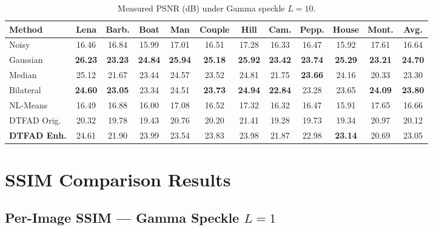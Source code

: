 \documentclass[12pt,a4paper]{article}
\newcommand{\best}[1]{\textcolor{bestgreen}{\textbf{#1}}}
\newcommand{\second}[1]{\textcolor{secondbest}{\textbf{#1}}}
\begin{document}
\begin{table}[H]
\centering
\caption{Measured PSNR (dB) under Gamma speckle $L=10$.}
\label{tab:psnr_L10_measured}
\small
\setlength{\tabcolsep}{3pt}
\begin{tabular}{l*{10}{c}|c}
\toprule
\textbf{Method} & \textbf{Lena} & \textbf{Barb.} & \textbf{Boat} & \textbf{Man} & \textbf{Couple} & \textbf{Hill} & \textbf{Cam.} & \textbf{Pepp.} & \textbf{House} & \textbf{Mont.} & \textbf{Avg.} \\
\midrule
\rowcolor{lightblue!30}
Noisy & 16.46 & 16.84 & 15.99 & 17.01 & 16.51 & 17.28 & 16.33 & 16.47 & 15.92 & 17.61 & 16.64 \\
\midrule
Gaussian & \best{26.23} & \best{23.23} & \best{24.84} & \best{25.94} & \best{25.18} & \best{25.92} & \best{23.42} & \second{23.74} & \best{25.29} & \best{23.21} & \best{24.70} \\
Median & 25.12 & 21.67 & 23.44 & 24.57 & 23.52 & 24.81 & 21.75 & \best{23.66} & 24.16 & 20.33 & 23.30 \\
Bilateral & \second{24.60} & \second{23.05} & 23.34 & 24.51 & \second{23.73} & \second{24.94} & \second{22.84} & 23.28 & 23.65 & \second{24.09} & \second{23.80} \\
NL-Means & 16.49 & 16.88 & 16.00 & 17.08 & 16.52 & 17.32 & 16.32 & 16.47 & 15.91 & 17.65 & 16.66 \\
DTFAD Orig. & 20.32 & 19.78 & 19.43 & 20.76 & 20.20 & 21.41 & 19.28 & 19.73 & 19.34 & 20.97 & 20.12 \\
\textbf{DTFAD Enh.} & 24.61 & 21.90 & 23.99 & 23.54 & 23.83 & 23.98 & 21.87 & 22.98 & \second{23.14} & 20.69 & 23.05 \\
\bottomrule
\end{tabular}
\end{table}

\section{SSIM Comparison Results}

\subsection{Per-Image SSIM — Gamma Speckle $L=1$}
\end{document}
